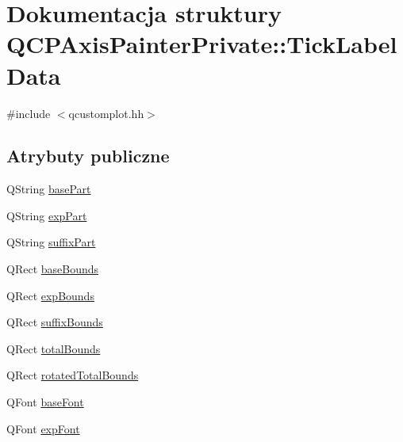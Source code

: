 \hypertarget{struct_q_c_p_axis_painter_private_1_1_tick_label_data}{}\section{Dokumentacja struktury Q\+C\+P\+Axis\+Painter\+Private\+:\+:Tick\+Label\+Data}
\label{struct_q_c_p_axis_painter_private_1_1_tick_label_data}


{\ttfamily \#include $<$qcustomplot.\+hh$>$}

\subsection*{Atrybuty publiczne}
\begin{DoxyCompactItemize}
\item 
Q\+String \hyperlink{struct_q_c_p_axis_painter_private_1_1_tick_label_data_ad65b76a5cafc412179a20b5d79809fc4}{base\+Part}
\item 
Q\+String \hyperlink{struct_q_c_p_axis_painter_private_1_1_tick_label_data_a09692e4ea092137278b4ac051d5fdf2b}{exp\+Part}
\item 
Q\+String \hyperlink{struct_q_c_p_axis_painter_private_1_1_tick_label_data_a3cbf21c6411730a318f8d2287b77d840}{suffix\+Part}
\item 
Q\+Rect \hyperlink{struct_q_c_p_axis_painter_private_1_1_tick_label_data_aac1047ae6ab8e9f5a42923082aabfff5}{base\+Bounds}
\item 
Q\+Rect \hyperlink{struct_q_c_p_axis_painter_private_1_1_tick_label_data_a6722d2bcefb93011e9dc42301b966846}{exp\+Bounds}
\item 
Q\+Rect \hyperlink{struct_q_c_p_axis_painter_private_1_1_tick_label_data_aa286a44422223bd4f0b044cc822079f6}{suffix\+Bounds}
\item 
Q\+Rect \hyperlink{struct_q_c_p_axis_painter_private_1_1_tick_label_data_afbb3163cf4c628914f1b703945419ea5}{total\+Bounds}
\item 
Q\+Rect \hyperlink{struct_q_c_p_axis_painter_private_1_1_tick_label_data_aa4d38c5ea47c9184a78ee33ae7f1012e}{rotated\+Total\+Bounds}
\item 
Q\+Font \hyperlink{struct_q_c_p_axis_painter_private_1_1_tick_label_data_a0d4958a706debaa8d19a9b65fc090d56}{base\+Font}
\item 
Q\+Font \hyperlink{struct_q_c_p_axis_painter_private_1_1_tick_label_data_adc10767ebcb719d6927c012a38b9d933}{exp\+Font}
\end{DoxyCompactItemize}


